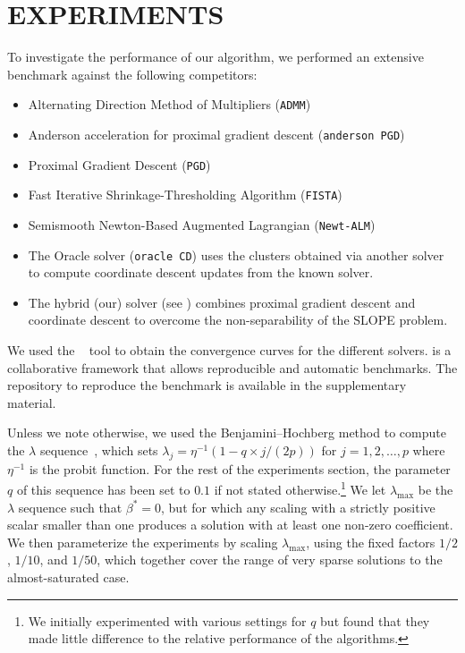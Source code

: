 \section{EXPERIMENTS}\label{sec:experiments}

To investigate the performance of our algorithm, we performed an extensive benchmark against the following competitors:
\begin{itemize}[noitemsep]
  \item Alternating Direction Method of Multipliers (\texttt{ADMM})~\parencite{boyd2010}
  \item Anderson acceleration for proximal gradient descent (\texttt{anderson PGD})~\parencite{zhang2020}
  \item Proximal Gradient Descent (\texttt{PGD})~\parencite{combettes2005}
  \item Fast Iterative Shrinkage-Thresholding Algorithm (\texttt{FISTA})~\parencite{beck2009}
  \item Semismooth Newton-Based Augmented Lagrangian (\texttt{Newt-ALM})~\parencite{Ziyan2019}
  \item The Oracle solver (\texttt{oracle CD}) uses the clusters obtained via another
        solver to compute coordinate descent updates from the known solver.
  \item The hybrid (our) solver (see ) combines proximal gradient descent
        and coordinate descent to overcome the non-separability of the SLOPE problem.
\end{itemize}

We used the ~\parencite{moreau2022benchopt} tool to obtain the convergence curves for the different solvers.
 is a collaborative framework that allows reproducible and automatic benchmarks.
The repository to reproduce the benchmark is available in the supplementary material.

Unless we note otherwise, we used the Benjamini--Hochberg method to compute the \(\lambda\) sequence~\parencite{bogdan2015},
which sets $\lambda_j = \eta^{-1}(1 - q\times j / (2p))$ for $j=1, 2, \hdots, p$ where $\eta^{-1}$ is the probit function.
For the rest of the experiments section, the parameter $q$ of this sequence has been set to $0.1$ if not stated otherwise.\footnote{We initially experimented with various settings for \(q\) but found that they made little difference to the relative performance of the algorithms.}
We let \(\lambda_\text{max}\) be the \(\lambda\) sequence such that \(\beta^* = 0\), but for which any scaling with a strictly positive scalar smaller than one produces a solution with at least one non-zero coefficient.
We then parameterize the experiments by scaling \(\lambda_\text{max}\), using the fixed factors \(1/2\), \(1/10\), and \(1/50\), which together cover the range of very sparse solutions to the almost-saturated case.

